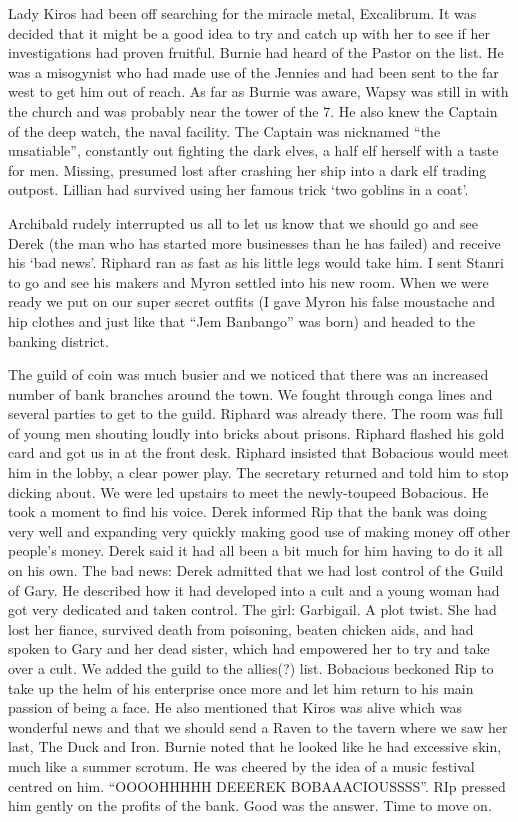 Lady Kiros had been off searching for the miracle metal, Excalibrum. It was decided that it might be a good idea to try and catch up with her to see if her investigations had proven fruitful. Burnie had heard of the Pastor on the list. He was a misogynist who had made use of the Jennies and had been sent to the far west to get him out of reach. As far as Burnie was aware, Wapsy was still in with the church and was probably near the tower of the 7. He also knew the Captain of the deep watch, the naval facility. The Captain was nicknamed “the unsatiable”, constantly out fighting the dark elves, a half elf herself with a taste for men. Missing, presumed lost after crashing her ship into a dark elf trading outpost. Lillian had survived using her famous trick ‘two goblins in a coat’.\medskip

Archibald rudely interrupted us all to let us know that we should go and see Derek (the man who has started more businesses than he has failed) and receive his ‘bad news’. Riphard ran as fast as his little legs would take him. I sent Stanri to go and see his makers and Myron settled into his new room. When we were ready we put on our super secret outfits (I gave Myron his false moustache and hip clothes and just like that “Jem Banbango” was born) and headed to the banking district.\medskip

The guild of coin was much busier and we noticed that there was an increased number of bank branches around the town. We fought through conga lines and several parties to get to the guild. Riphard was already there. The room was full of young men shouting loudly into bricks about prisons. Riphard flashed his gold card and got us in at the front desk. Riphard insisted that Bobacious would meet him in the lobby, a clear power play. The secretary returned and told him to stop dicking about. We were led upstairs to meet the newly-toupeed Bobacious. He took a moment to find his voice. Derek informed Rip that the bank was doing very well and expanding very quickly making good use of making money off other people’s money. Derek said it had all been a bit much for him having to do it all on his own. The bad news: Derek admitted that we had lost control of the Guild of Gary. He described how it had developed into a cult and a young woman had got very dedicated and taken control. The girl: Garbigail. A plot twist. She had lost her fiance, survived death from poisoning, beaten chicken aids, and had spoken to Gary and her dead sister, which had empowered her to try and take over a cult. We added the guild to the allies(?) list. Bobacious beckoned Rip to take up the helm of his enterprise once more and let him return to his main passion of being a face. He also mentioned that Kiros was alive which was wonderful news and that we should send a Raven to the tavern where we saw her last, The Duck and Iron. Burnie noted that he looked like he had excessive skin, much like a summer scrotum. He was cheered by the idea of a music festival centred on him. “OOOOHHHHH DEEEREK BOBAAACIOUSSSS”. RIp pressed him gently on the profits of the bank. Good was the answer. Time to move on.\medskip

